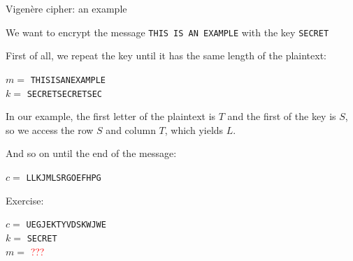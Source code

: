 \begin{frame}{Vigenère cipher: an example}
  
  We want to encrypt the message \texttt{THIS IS AN EXAMPLE} with the key \texttt{SECRET}

  \medskip
  
  First of all, we repeat the key until it has the same length of the plaintext: \\

  \medskip
  
  \phantom{pad}$m =$ \texttt{THISISANEXAMPLE}\\
  \phantom{pad}$k =$ \texttt{SECRETSECRETSEC}\\

  \medskip
  
  In our example, the first letter of the plaintext is $T$ and the first of the key is $S$, so we access the row $S$ and column $T$, which yields $L$. 
  
  And so on until the end of the message:\\

  \medskip
  
  \phantom{pad}$c =$ \texttt{LLKJMLSRGOEFHPG}

  \medskip

  Exercise: 
  
  \phantom{pad}$c =$ \texttt{UEGJEKTYVDSKWJWE}\\
  \phantom{pad}$k =$ \texttt{SECRET}\\
  \phantom{pad}$m =$ \textcolor{red}{???}
  
\end{frame}


